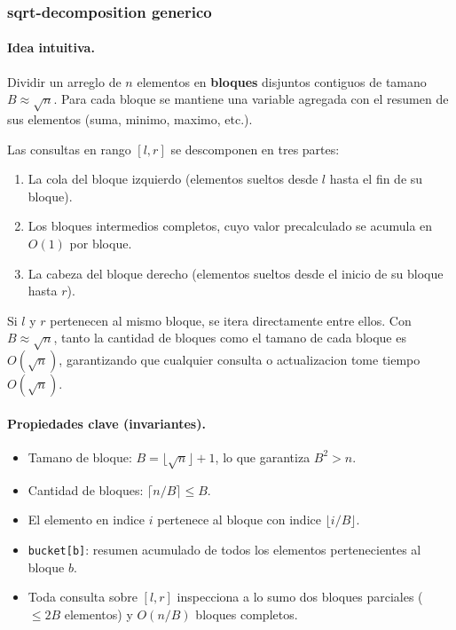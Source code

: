 \subsubsection{sqrt-decomposition generico}

\paragraph{Idea intuitiva.}
Dividir un arreglo de $n$ elementos en \textbf{bloques} disjuntos contiguos de tamano $B \approx \sqrt{n}$. Para cada bloque se mantiene una variable agregada con el resumen de sus elementos (suma, minimo, maximo, etc.). 

Las consultas en rango $[l, r]$ se descomponen en tres partes:
\begin{enumerate}\setlength\itemsep{0pt}
	\item La cola del bloque izquierdo (elementos sueltos desde $l$ hasta el fin de su bloque).
	\item Los bloques intermedios completos, cuyo valor precalculado se acumula en $O(1)$ por bloque.
	\item La cabeza del bloque derecho (elementos sueltos desde el inicio de su bloque hasta $r$).
\end{enumerate}
Si $l$ y $r$ pertenecen al mismo bloque, se itera directamente entre ellos. Con $B \approx \sqrt{n}$, tanto la cantidad de bloques como el tamano de cada bloque es $O(\sqrt{n})$, garantizando que cualquier consulta o actualizacion tome tiempo $O(\sqrt{n})$.

\paragraph{Propiedades clave (invariantes).}
\begin{itemize}\setlength\itemsep{0pt}
	\item Tamano de bloque: $B = \lfloor \sqrt{n} \rfloor + 1$, lo que garantiza $B^2 > n$.
	\item Cantidad de bloques: $\lceil n / B \rceil \le B$.
	\item El elemento en indice $i$ pertenece al bloque con indice $\lfloor i / B \rfloor$.
	\item \texttt{bucket[b]}: resumen acumulado de todos los elementos pertenecientes al bloque $b$.
	\item Toda consulta sobre $[l, r]$ inspecciona a lo sumo dos bloques parciales ($\le 2B$ elementos) y $O(n/B)$ bloques completos.
\end{itemize}

